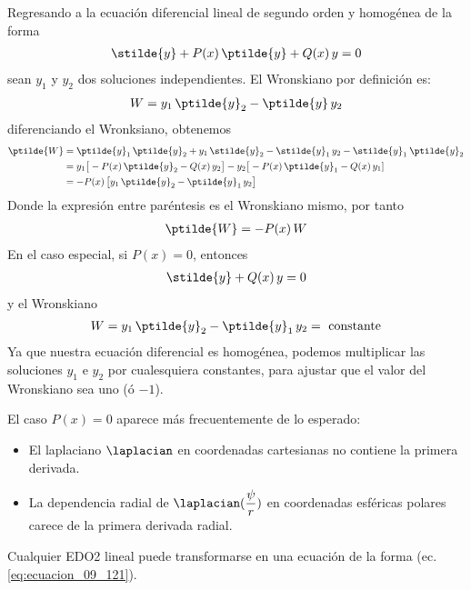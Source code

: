 Regresando a la ecuación diferencial lineal de segundo orden y homogénea de la forma
\begin{align}
\stilde{y} + P(x) \, \ptilde{y} + Q(x) \, y = 0
\label{eq:ecuacion_09_118}
\end{align}
sean $y_{1}$ y $y_{2}$ dos soluciones independientes. El Wronskiano por definición es:
\begin{align}
W = y_{1} \, \ptilde{y}_{2} - \ptilde{y} \, y_{2}
\label{eq:ecuacion_09_119}
\end{align}
diferenciando el Wronksiano, obtenemos
\begin{align*}
\ptilde{W} &= \ptilde{y}_{1} \, \ptilde{y}_{2} + y_{1} \, \stilde{y}_{2} - \stilde{y}_{1} \, y_{2} - \stilde{y}_{1} \: \ptilde{y}_{2} \\
&= y_{1} \big[ - P(x) \, \ptilde{y}_{2} - Q(x) \, y_{2} \big] - y_{2} \big[ - P(x) \, \ptilde{y}_{1} - Q(x)  \, y_{1}] \\
&= - P(x) \, \big[ y_{1} \, \ptilde{y}_{2} - \ptilde{y}_{1} \, y_{2} \big]
\end{align*}
Donde la expresión entre paréntesis es el Wronskiano mismo, por tanto
\begin{align}
\ptilde{W} = - P(x) \, W
\label{eq:ecuacion_09_120}
\end{align}
En el caso especial, si $P(x) = 0$, entonces
\begin{align}
\stilde{y} + Q(x) \, y = 0
\label{eq:ecuacion_09_121}
\end{align}
y el Wronskiano
\begin{align}
W = y_{1} \, \ptilde{y}_{2} - \ptilde{y}_{1} \, y_{2} = \mbox{ constante}
\label{eq:ecuacion_09_1202}
\end{align}
Ya que nuestra ecuación diferencial es homogénea, podemos multiplicar las soluciones $y_{1}$ e $y_{2}$ por cualesquiera constantes, para ajustar que el valor del Wronskiano sea uno (ó $-1$).
\par
El caso $P(x) = 0$ aparece más frecuentemente de lo esperado:
\begin{itemize}
\item El laplaciano $\laplacian$ en coordenadas cartesianas no contiene la primera derivada.
\item La dependencia radial de $\laplacian (\dfrac{\psi}{r})$ en coordenadas esféricas polares carece de la primera derivada radial.
\end{itemize}
Cualquier EDO2 lineal puede transformarse en una ecuación de la forma (ec. \ref{eq:ecuacion_09_121}).
\par
